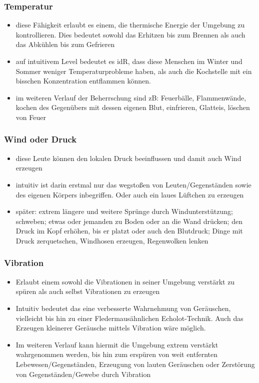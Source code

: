 \subsubsection{Temperatur}\label{sec:temperaturmagie}
\begin{itemize}
	\item diese Fähigkeit erlaubt es einem, die thermische Energie der Umgebung zu kontrollieren. Dies bedeutet sowohl das Erhitzen bis zum Brennen als auch das Abkühlen bis zum Gefrieren
	\item auf intuitivem Level bedeutet es idR, dass diese Menschen im Winter und Sommer weniger Temperaturprobleme haben, als auch die Kochstelle mit ein bisschen Konzentration entflammen können.
	\item im weiteren Verlauf der Beherrschung sind zB: Feuerbälle, Flammenwände, kochen des Gegenübers mit dessen eigenen Blut, einfrieren, Glatteis, löschen von Feuer
\end{itemize}

\subsubsection{Wind oder Druck}\label{sec:druckmagie}
\begin{itemize}
	\item diese Leute können den lokalen Druck beeinflussen und damit auch Wind erzeugen
	\item intuitiv ist darin erstmal nur das wegstoßen von Leuten/Gegenständen sowie des eigenen Körpers inbegriffen. Oder auch ein laues Lüftchen zu erzeugen
	\item später: extrem längere und weitere Sprünge durch Windunterstützung; schweben; etwas oder jemanden zu Boden oder an die Wand drücken; den Druck im Kopf erhöhen, bis er platzt oder auch den Blutdruck; Dinge mit Druck zerquetschen, Windhosen erzeugen, Regenwolken lenken
\end{itemize}

\subsubsection{Vibration}\label{sec:vibrationsmagie}
\begin{itemize}
	\item Erlaubt einem sowohl die Vibrationen in seiner Umgebung verstärkt zu spüren als auch selbst Vibrationen zu erzeugen
	\item Intuitiv bedeutet das eine verbesserte Wahrnehmung von Geräuschen, vielleicht bis hin zu einer Fledermausähnlichen Echolot-Technik. Auch das Erzeugen kleinerer Geräusche mittels Vibration wäre möglich.
	\item Im weiteren Verlauf kann hiermit die Umgebung extrem verstärkt wahrgenommen werden, bis hin zum erspüren von weit entfernten Lebewesen/Gegenständen, Erzeugung von lauten Geräuschen oder Zerstörung von Gegenständen/Gewebe durch Vibration
\end{itemize}


